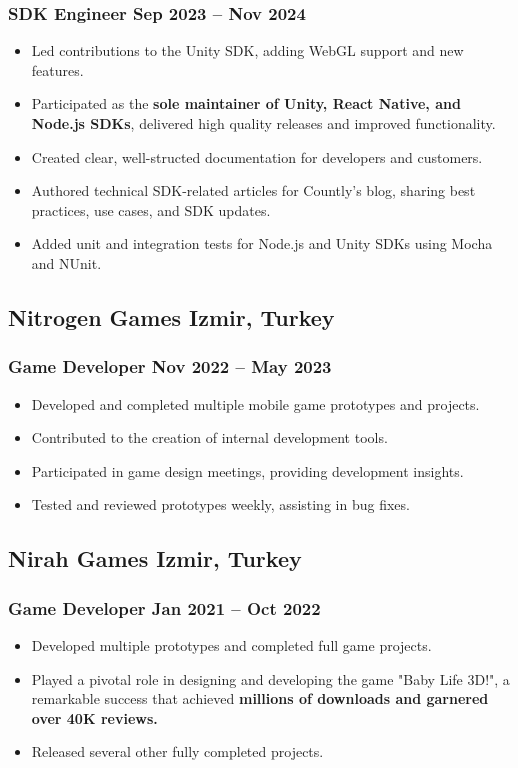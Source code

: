 \documentclass[11pt]{article}
\newcommand{\rside}[1]{
  \hfill {\normalfont\color{accent} #1}%
}
\begin{document}
\subsubsection{SDK Engineer \rside{Sep 2023 -- Nov 2024}}
\begin{itemize}
  \item Led contributions to the Unity SDK, adding WebGL support and new features.
  \item Participated as the \textbf{sole maintainer of Unity, React Native, and Node.js SDKs}, delivered high quality releases and improved functionality. 
  \item Created clear, well-structed documentation for developers and customers.
  \item Authored technical SDK-related articles for Countly's blog, sharing best practices, use cases, and SDK updates.
  \item Added unit and integration tests for Node.js and Unity SDKs using Mocha and NUnit.
\end{itemize}

\subsection{Nitrogen Games \rside{Izmir, Turkey}}
\subsubsection{Game Developer \rside{Nov 2022 -- May 2023}}
\begin{itemize}
  \item Developed and completed multiple mobile game prototypes and projects.
  \item Contributed to the creation of internal development tools.
  \item Participated in game design meetings, providing development insights.
  \item Tested and reviewed prototypes weekly, assisting in bug fixes.
\end{itemize}

\subsection{Nirah Games  \rside{Izmir, Turkey}}
\subsubsection{Game Developer \rside{Jan 2021 -- Oct 2022}}
\begin{itemize}
  \item Developed multiple prototypes and completed full game projects.
  \item Played a pivotal role in designing and developing the game "Baby Life 3D!", a remarkable success that achieved \textbf{millions of downloads and garnered over 40K reviews.}
  \item Released several other fully completed projects.
\end{itemize}
\end{document}

